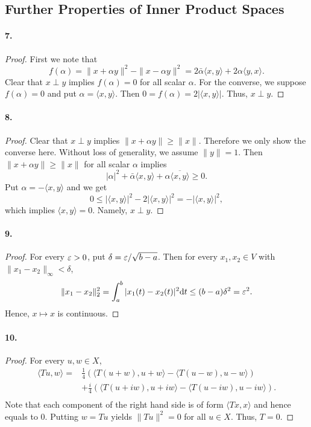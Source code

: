 \subsection{Further Properties of Inner Product Spaces}
  \paragraph{7.}
  \begin{proof}
    First we note that
    \[
      f(\alpha)=\|x+\alpha y\|^2-\|x-\alpha y\|^2 
      = 2\bar{\alpha}\langle x,y\rangle + 2\alpha\langle y,x\rangle.
    \]
    Clear that $x\perp y$ implies $f(\alpha)=0$ for all scalar $\alpha$. For the
    converse, we suppose $f(\alpha)=0$ and put $\alpha=\langle x, y\rangle$. 
    Then $0=f(\alpha)=2|\langle x, y\rangle|$. Thus, $x\perp y$.
  \end{proof}
  
  \paragraph{8.}
  \begin{proof}
    Clear that $x\perp y$ implies $\|x+\alpha y\|\ge \|x\|$. Therefore we only
    show the converse here. Without loss of generality, we assume $\|y\|=1$. 
    Then $\|x+\alpha y\|\ge \|x\|$ for all scalar $\alpha$ implies
    \[
      |\alpha|^2 + 
      \bar{\alpha}\langle x, y\rangle + \alpha\overline{\langle x, y\rangle}
      \ge 0.
    \]
    Put $\alpha=-\langle x, y\rangle$ and we get
    \[
      0 \le |\langle x, y\rangle|^2 - 2|\langle x, y\rangle|^2
      =-|\langle x, y\rangle|^2,
    \]
    which implies $\langle x, y\rangle=0$. Namely, $x\perp y$.
  \end{proof}
  
  \paragraph{9.}
  \begin{proof}
    For every $\varepsilon>0$, put $\delta=\varepsilon/\sqrt{b-a}$. Then for every $x_1,x_2\in
    V$ with $\|x_1-x_2\|_\infty<\delta$,
    \[
      \|x_1-x_2\|_2^2 = \int_a^b|x_1(t)-x_2(t)|^2\mathrm{d} t
      \le (b-a)\delta^2 = \varepsilon^2.
    \]
    Hence, $x\mapsto x$ is continuous.
  \end{proof}
  
  \paragraph{10.}
  \begin{proof}
    For every $u, w\in X$,
    \begin{align*}
      \langle Tu, w\rangle = 
      & \frac{1}{4}(\langle T(u+w), u+w \rangle - \langle T(u-w), u-w \rangle)\\
      &+ \frac{i}{4}
        (\langle T(u+iw), u+iw\rangle - \langle T(u-iw), u-iw\rangle).\\
    \end{align*}
    Note that each component of the right hand side is of form $\langle Tx, x
    \rangle$ and hence equals to $0$. Putting $w=Tu$ yields $\|Tu\|^2=0$ for all
    $u\in X$. Thus, $T=0$.
  \end{proof}

